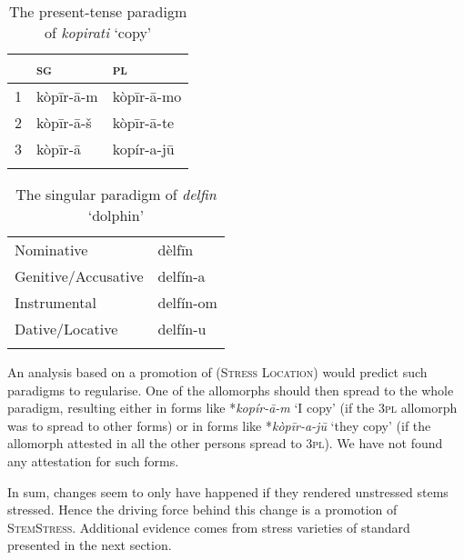\documentclass[output=paper,nonflat,colorlinks,citecolor=brown,newtxmath]{langsci/langscibook}
\begin{document}
\begin{table}
\caption{The present-tense paradigm of \textit{kopirati} `copy'}
\label{tab:kager:8}
\begin{tabular}{ l l l }
  \lsptoprule
& \textsc{sg}  & \textsc{pl}\\
 \midrule
 1  &  kòpīr-ā-m  &   kòpīr-ā-mo \\
2  &  kòpīr-ā-š  & kòpīr-ā-te \\
3  &  kòpīr-ā & kopír-a-jū \\
  \lspbottomrule
 \end{tabular}
\end{table}

\begin{table}
\caption{The singular paradigm of \textit{delfin} `dolphin'}
\label{tab:kager:9}
 \begin{tabular}{   l l }
    \lsptoprule
 Nominative  & dèlfīn  \\
Genitive/Accusative  & delfín-a \\
Instrumental   &  delfín-om \\
Dative/Locative   &  delfín-u \\
\lspbottomrule
 \end{tabular}
\end{table}

An analysis based on a promotion of \textsc{(Stress Location)} would predict such paradigms to regularise. One of the allomorphs should then spread to the whole paradigm, resulting either in forms like *\textit{kopír-ā-m} `I copy' (if the 3\textsc{pl} allomorph was to spread to other forms) or in forms like *\textit{kòpīr-a-jū} `they copy' (if the allomorph attested in all the other persons spread to 3\textsc{pl}). We have not found any attestation for such forms.

In sum, changes seem to only have happened if they rendered unstressed stems stressed. Hence the driving force behind this change is a promotion of \textsc{StemStress}. Additional evidence comes from stress varieties of standard  presented in the next section.
\end{document}

